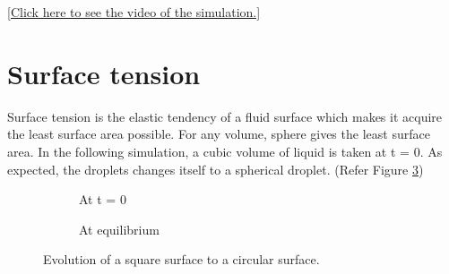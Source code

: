 \documentclass{article}
\begin{document}
\begin{flushright}
	\href{https://www.youtube.com/watch?v=B9JiYVE437Y}{[Click here to see the video of the simulation.]}
\end{flushright}
   
\section{Surface tension}
Surface tension is the elastic tendency of a fluid surface which makes it acquire the least surface area possible. For any volume, sphere gives the least surface area. In the following simulation, a cubic volume of liquid is taken at t = 0. As expected, the droplets changes itself to a spherical droplet. (Refer Figure \ref{fig:surface_tension})

\begin{figure}[h!]
	\centering
	\begin{subfigure}[h!]{4cm}            
		\caption{At t = 0}
		\label{Fig:surface_initial}
	\end{subfigure}
	\begin{subfigure}[h!]{4cm}
		\centering
		\caption{At equilibrium }
		\label{Fig:surface_final}
	\end{subfigure}
	\caption{Evolution of a square surface to a circular surface.}\label{fig:surface_tension}
\end{figure}
\end{document}
